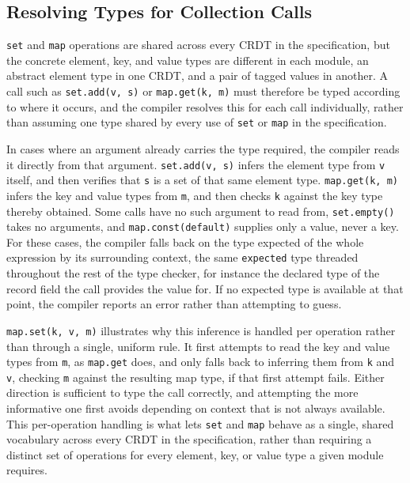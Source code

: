 \subsection{Resolving Types for Collection Calls}
\label{sub:collections}

\texttt{set} and \texttt{map} operations are shared across every CRDT in the specification, but the concrete element,
key, and value types are different in each module, an abstract element type in one CRDT, and a pair of tagged values in
another. A call such as \texttt{set.add(v, s)} or \texttt{map.get(k, m)} must therefore be typed according to where it
occurs, and the compiler resolves this for each call individually, rather than assuming one type shared by every use of
\texttt{set} or \texttt{map} in the specification.

In cases where an argument already carries the type required, the compiler reads it directly from that argument.
\texttt{set.add(v, s)} infers the element type from \texttt{v} itself, and then verifies that \texttt{s} is a set of that
same element type. \texttt{map.get(k, m)} infers the key and value types from \texttt{m}, and then checks \texttt{k}
against the key type thereby obtained. Some calls have no such argument to read from, \texttt{set.empty()} takes no
arguments, and \texttt{map.const(default)} supplies only a value, never a key. For these cases, the compiler falls back
on the type expected of the whole expression by its surrounding context, the same \texttt{expected} type threaded
throughout the rest of the type checker, for instance the declared type of the record field the call provides the value
for. If no expected type is available at that point, the compiler reports an error rather than attempting to guess.

\texttt{map.set(k, v, m)} illustrates why this inference is handled per operation rather than through a single, uniform
rule. It first attempts to read the key and value types from \texttt{m}, as \texttt{map.get} does, and only falls back
to inferring them from \texttt{k} and \texttt{v}, checking \texttt{m} against the resulting map type, if that first
attempt fails. Either direction is sufficient to type the call correctly, and attempting the more informative one first
avoids depending on context that is not always available. This per-operation handling is what lets \texttt{set} and
\texttt{map} behave as a single, shared vocabulary across every CRDT in the specification, rather than requiring a
distinct set of operations for every element, key, or value type a given module requires.
